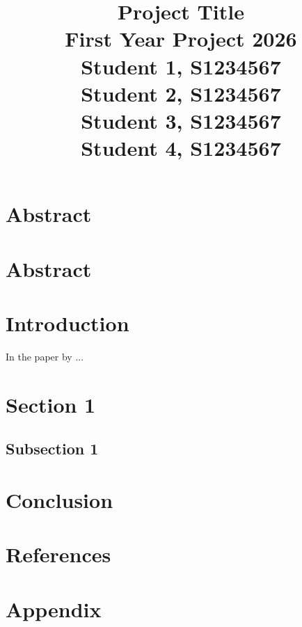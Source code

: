\documentclass[a4paper,12pt,twoside]{article}
\title{
    \begin{flushleft}
    \vspace{5cm}
        {\bf
        {\Huge Project Title}}\\[4ex]
        First Year Project 2026\\[20ex]
        {\LARGE Student 1, S1234567 \\ [1ex]
        Student 2, S1234567\\ [1ex]
        Student 3, S1234567 \\ [1ex]
        Student 4, S1234567}
    \end{flushleft}
}
\date{}
\begin{document}
\maketitle
\thispagestyle{titlepage}
\newpage
\section*{Abstract}
\newpage
\tableofcontents

\newpage

\setlength{\headheight}{32pt}

\pagestyle{body}
\newpage
\section{Abstract}\label{sec:abstract}

\newpage

\section{Introduction}
In the paper by \cite{citation_key} ...
\label{sec: intro}


\section{Section 1}\label{sec:sec1}
\subsection{Subsection 1}\label{ssec:inf}


\section{Conclusion}\label{sec:conclusion}


\section{References}



\newpage
\section{Appendix}\label{appdx:1}

\end{document}
